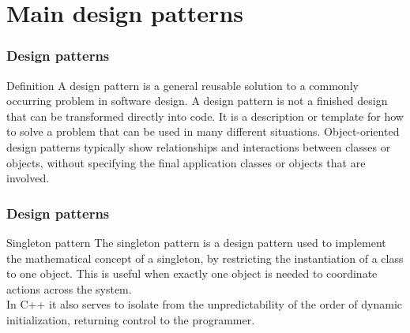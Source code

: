 \documentclass[8pt]{beamer}
\begin{document}
\section[Main design patterns]{Main design patterns}
\begin{frame}
  \frametitle{Design patterns}
  \begin{block}{Definition}
    A \alert{design pattern} is a general reusable solution to a commonly occurring problem in software design. A design pattern is not a finished design that can be transformed directly into code. It is a description or template for how to solve a problem that can be used in many different situations. Object-oriented design patterns typically show relationships and interactions between classes or objects, without specifying the final application classes or objects that are involved.
  \end{block}
\end{frame}
\begin{frame}
  \frametitle{Design patterns}
  \begin{block}{Singleton pattern}
    The \alert{singleton pattern} is a design pattern used to implement the mathematical concept of a singleton, by restricting the instantiation of a class to one object. This is useful when exactly one object is needed to coordinate actions across the system.\\
    In C++ it also serves to isolate from the unpredictability of the order of dynamic initialization, returning control to the programmer.
  \end{block}
  \vspace{10mm}
  \centering {}
\end{frame}
\end{document}
